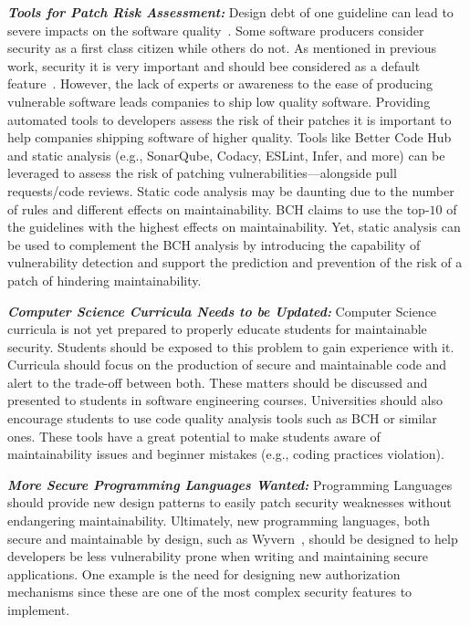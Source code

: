 \documentclass[smallextended]{svjour3}       %
\begin{document}
\textit{\textbf{Tools for Patch Risk Assessment:}}
	Design debt of one guideline can lead to severe impacts on the 
	software quality~\cite{10.1145/1985362.1985366}. Some software 
	producers consider security as a first class citizen while others 
	do not. As mentioned in previous work, security it is very important 
	and should bee considered as a default feature~\cite{10.1145/2489828.2489830,kurilova2014wyvern,mcgraw2004software}. 
	However, the lack of experts or awareness to the ease of producing 
	vulnerable software leads companies to ship low quality software. 
	Providing automated tools to developers assess the risk of their 
	patches it is important to help companies shipping software of higher quality. 
	Tools like Better Code Hub and static analysis (e.g., 
	SonarQube, Codacy, ESLint, Infer, and more) can be leveraged 
	to assess the risk of patching vulnerabilities---alongside pull
	requests/code reviews. Static code analysis may be daunting due 
	to the number of rules and different effects
	on maintainability. BCH claims to use the top-$10$ of the guidelines
	with the highest effects on maintainability. Yet, static analysis 
	can be used to complement the BCH analysis by introducing
	the capability of vulnerability detection and support the prediction 
	and prevention of the risk of a patch of hindering maintainability.
%

\textit{\textbf{Computer Science Curricula Needs to be Updated:}}
	Computer Science curricula is not yet prepared to properly educate 
	students for maintainable security. Students should be exposed to 
	this problem to gain experience with it. Curricula should focus on 
	the production of secure and maintainable code and alert to the 
	trade-off between both. These matters should be discussed and 
	presented to students in software engineering courses.
	Universities should also encourage students to use code quality 
	analysis tools such as BCH or similar ones. These tools have a 
	great potential to make students aware of maintainability issues 
	and beginner mistakes (e.g., coding practices violation).
%	

\textit{\textbf{More Secure Programming Languages Wanted:}} Programming 
	Languages should provide new design patterns to easily patch security weaknesses 
	without endangering maintainability. Ultimately, new programming languages, 
	both secure and maintainable by design, such as Wyvern~\cite{10.1145/2489828.2489830,kurilova2014wyvern}, 
	should be designed to help developers be less vulnerability prone when 
	writing and maintaining secure applications. One example is the need for 
	designing new authorization mechanisms since these are one of the most 
	complex security features to implement.
\end{document}
